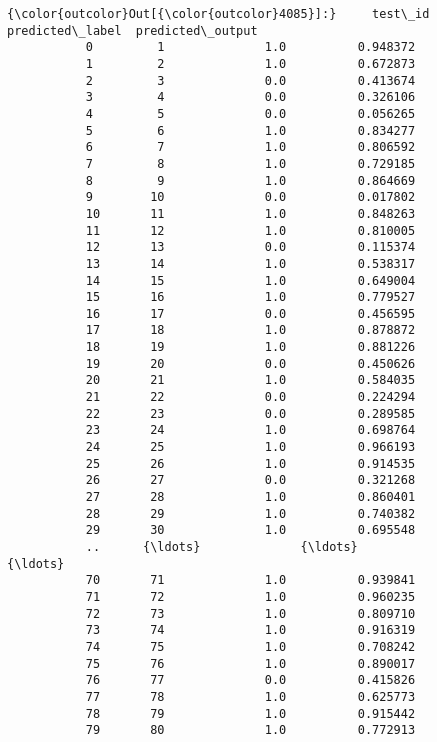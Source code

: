 \documentclass{article}
\begin{document}
            \begin{Verbatim}[commandchars=\\\{\}]
{\color{outcolor}Out[{\color{outcolor}4085}]:}     test\_id  predicted\_label  predicted\_output
           0         1              1.0          0.948372
           1         2              1.0          0.672873
           2         3              0.0          0.413674
           3         4              0.0          0.326106
           4         5              0.0          0.056265
           5         6              1.0          0.834277
           6         7              1.0          0.806592
           7         8              1.0          0.729185
           8         9              1.0          0.864669
           9        10              0.0          0.017802
           10       11              1.0          0.848263
           11       12              1.0          0.810005
           12       13              0.0          0.115374
           13       14              1.0          0.538317
           14       15              1.0          0.649004
           15       16              1.0          0.779527
           16       17              0.0          0.456595
           17       18              1.0          0.878872
           18       19              1.0          0.881226
           19       20              0.0          0.450626
           20       21              1.0          0.584035
           21       22              0.0          0.224294
           22       23              0.0          0.289585
           23       24              1.0          0.698764
           24       25              1.0          0.966193
           25       26              1.0          0.914535
           26       27              0.0          0.321268
           27       28              1.0          0.860401
           28       29              1.0          0.740382
           29       30              1.0          0.695548
           ..      {\ldots}              {\ldots}               {\ldots}
           70       71              1.0          0.939841
           71       72              1.0          0.960235
           72       73              1.0          0.809710
           73       74              1.0          0.916319
           74       75              1.0          0.708242
           75       76              1.0          0.890017
           76       77              0.0          0.415826
           77       78              1.0          0.625773
           78       79              1.0          0.915442
           79       80              1.0          0.772913

\end{Verbatim}
\end{document}
